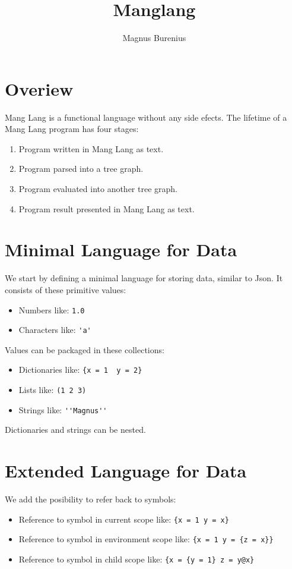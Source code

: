 \documentclass[a4paper,12pt]{article}
\title{Manglang}
\author{Magnus Burenius}
\begin{document}
\maketitle

\section{Overiew}

Mang Lang is a functional language without any side efects. The lifetime of a Mang Lang program has four stages:
\begin{enumerate}
\item Program written in Mang Lang as text.
\item Program parsed into a tree graph.
\item Program evaluated into another tree graph.
\item Program result presented in Mang Lang as text.
\end{enumerate}

\section{Minimal Language for Data}

We start by defining a minimal language for storing data, similar to Json. It consists of these primitive values:
\begin{itemize}
\item Numbers like: \lstinline|1.0|
\item Characters like: \lstinline|'a'|
\end{itemize}
Values can be packaged in these collections:
\begin{itemize}
\item Dictionaries like: \lstinline|{x = 1  y = 2}|
\item Lists like: \lstinline|(1 2 3)|
\item Strings like: \lstinline|''Magnus''|
\end{itemize}
Dictionaries and strings can be nested.

\section{Extended Language for Data}

We add the posibility to refer back to symbols:
\begin{itemize}
\item Reference to symbol in current scope like: \lstinline|{x = 1 y = x}|
\item Reference to symbol in environment scope like:  \lstinline|{x = 1 y = {z = x}}|
\item Reference to symbol in child scope like:  \lstinline|{x = {y = 1} z = y@x}|
\end{itemize}
\end{document}
